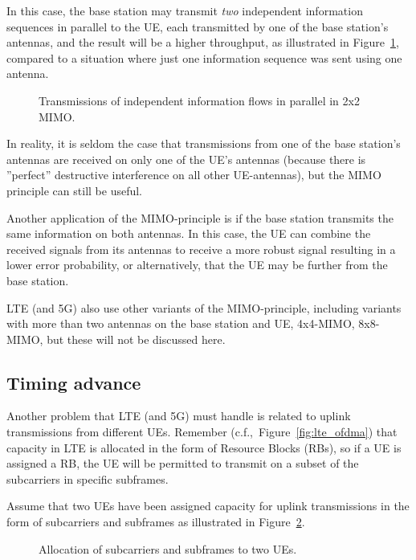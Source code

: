 In this case, the base station may transmit \emph{two} independent information sequences in parallel to the UE, each transmitted by one of the base station's antennas, and the result will be a higher throughput, as illustrated in Figure~\ref{fig:mimo2}, compared to a situation where just one information sequence was sent using one antenna.

\begin{figure}[htbp]
\centering
{}
\caption{\label{fig:mimo2}Transmissions of independent information flows in parallel in 2x2 MIMO.}
\end{figure}

In reality, it is seldom the case that transmissions from one of the base station's antennas are received on only one of the UE's antennas (because there is ''perfect'' destructive interference on all other UE-antennas), but the MIMO principle can still be useful.

Another application of the MIMO-principle is if the base station transmits the same information on both antennas. In this case, the UE can combine the received signals from its antennas to receive a more robust signal resulting in a lower error probability, or alternatively, that the UE may be further from the base station.

LTE (and 5G) also use other variants of the MIMO-principle, including variants with more than two antennas on the base station and UE, \eg 4x4-MIMO, 8x8-MIMO, but these will not be discussed here.

\subsection{Timing advance}\label{sec:timing_advance}
Another problem that LTE (and 5G) must handle is related to uplink transmissions from different UEs. Remember (c.f.,~Figure~\ref{fig:lte_ofdma}) that capacity in LTE is allocated in the form of Resource Blocks (RBs), so if a UE is assigned a RB, the UE will be permitted to transmit on a subset of the subcarriers in specific subframes.

Assume that two UEs have been assigned capacity for uplink transmissions in the form of subcarriers and subframes as illustrated in Figure~\ref{fig:lte_ta1}.
\begin{figure}[htbp]
\centering
{}
\caption{\label{fig:lte_ta1}Allocation of subcarriers and subframes to two UEs.}
\end{figure}


